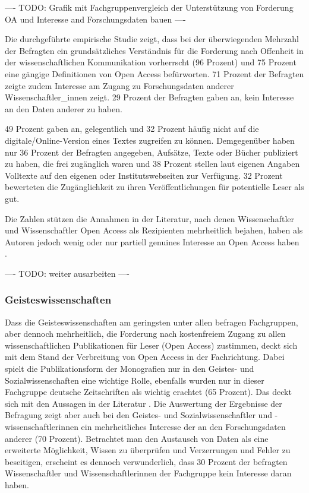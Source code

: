 ---- TODO: Grafik mit Fachgruppenvergleich der Unterstützung von Forderung OA und Interesse and Forschungsdaten bauen  ----

Die durchgeführte empirische Studie zeigt, dass bei der überwiegenden Mehrzahl der Befragten ein grundsätzliches Verständnis für die Forderung nach Offenheit in der wissenschaftlichen Kommunikation vorherrscht (96 Prozent) und 75 Prozent eine gängige Definitionen von Open Access befürworten. 71 Prozent der Befragten zeigte zudem Interesse am Zugang zu Forschungsdaten anderer Wissenschaftler_innen zeigt. 29 Prozent der Befragten gaben an, kein Interesse an den Daten anderer zu haben.

49 Prozent gaben an, gelegentlich und 32 Prozent häufig nicht auf die digitale/Online-Version eines Textes zugreifen zu können. Demgegenüber haben nur 36 Prozent der Befragten angegeben, Aufsätze, Texte oder Bücher publiziert zu haben, die frei zugänglich waren und 38 Prozent stellen laut eigenen Angaben Volltexte auf den eigenen oder Institutswebseiten zur Verfügung. 32 Prozent bewerteten die Zugänglichkeit zu ihren Veröffentlichungen für potentielle Leser als gut.

Die Zahlen stützen die Annahmen in der Literatur, nach denen Wissenschaftler und Wissenschaftler  Open Access als Rezipienten mehrheitlich bejahen, haben als Autoren jedoch wenig oder nur partiell genuines Interesse an Open Access haben \cite{wein_2010_erwerbung}.

---- TODO: weiter ausarbeiten ----

\subsubsection{Geisteswissenschaften}

Dass die Geisteswissenschaften am geringsten unter allen befragen Fachgruppen, aber dennoch mehrheitlich, die Forderung nach kostenfreiem Zugang zu allen wissenschaftlichen Publikationen für Leser (Open Access) zustimmen, deckt sich mit dem Stand der Verbreitung von Open Access in der Fachrichtung. Dabei spielt die Publikationsform der Monografien nur in den Geistes- und Sozialwissenschaften eine wichtige Rolle, ebenfalls wurden nur in dieser Fachgruppe deutsche Zeitschriften als wichtig erachtet  (65 Prozent). Das deckt sich mit den Aussagen in der Literatur \cite{hagner_2015_sache_buches} \cite{naeder_2010_open} \cite{hollricher_wandel_2009} \cite{Lossau_oa_2007}. Die Auswertung der Ergebnisse der Befragung zeigt aber auch bei den Geistes- und Sozialwissenschaftler und -wissenschaftlerinnen ein mehrheitliches Interesse der an den Forschungsdaten anderer (70 Prozent). Betrachtet man den Austausch von Daten als eine erweiterte Möglichkeit, Wissen zu überprüfen und Verzerrungen und Fehler zu beseitigen, erscheint es dennoch verwunderlich, dass 30 Prozent der befragten Wissenschaftler und Wissenschaftlerinnen der Fachgruppe kein Interesse daran haben.

